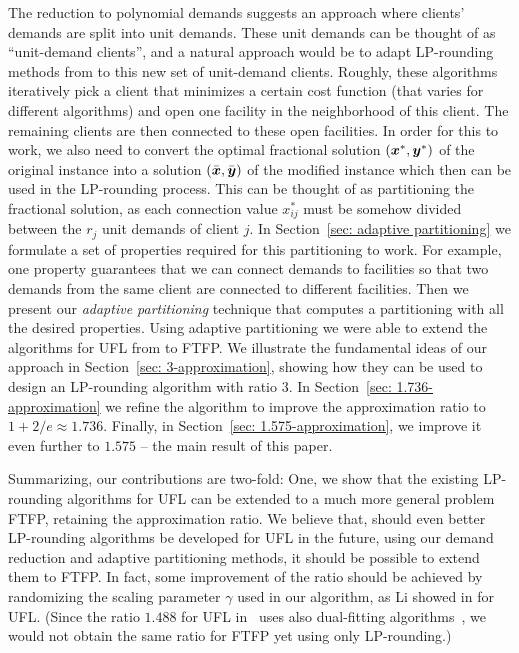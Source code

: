 \documentclass[11pt]{article}
\begin{document}
The reduction to polynomial demands suggests an approach
where clients' demands are split into unit demands. These
unit demands can be thought of as ``unit-demand clients'',
and a natural approach would be to adapt LP-rounding methods
from \cite{gupta08,ChudakS04,ByrkaGS10} to this new set of
unit-demand clients.  Roughly, these algorithms iteratively
pick a client that minimizes a certain cost function (that
varies for different algorithms) and open one facility in
the neighborhood of this client. The remaining clients are
then connected to these open facilities.  In order for this
to work, we also need to convert the optimal fractional
solution $(\boldsymbol{x}^\ast,\boldsymbol{y}^\ast)$ of the original instance
into a solution $(\bar{\boldsymbol{x}},\bar{\boldsymbol{y}})$ of the modified instance
which then can be used in the LP-rounding process. This can
be thought of as partitioning the fractional solution, as
each connection value $x^\ast_{ij}$ must be somehow divided
between the $r_j$ unit demands of client $j$. In
Section~\ref{sec: adaptive partitioning} we formulate a set
of properties required for this partitioning to work. For
example, one property guarantees that we can connect demands
to facilities so that two demands from the same client are
connected to different facilities. Then we present our
\emph{adaptive partitioning} technique that computes a
partitioning with all the desired properties. Using adaptive
partitioning we were able to extend the algorithms for UFL
from \cite{gupta08,ChudakS04,ByrkaGS10} to FTFP. We
illustrate the fundamental ideas of our approach in
Section~\ref{sec: 3-approximation}, showing how they can be
used to design an LP-rounding algorithm with ratio $3$.  In
Section~\ref{sec: 1.736-approximation} we refine the
algorithm to improve the approximation ratio to
$1+2/e\approx 1.736$.  Finally, in Section~\ref{sec:
  1.575-approximation}, we improve it even further to
$1.575$ -- the main result of this paper.

Summarizing, our contributions are two-fold: One, we show
that the existing LP-rounding algorithms for UFL can be
extended to a much more general problem FTFP, retaining the
approximation ratio. We believe that, should even better
LP-rounding algorithms be developed for UFL in the future,
using our demand reduction and adaptive partitioning
methods, it should be possible to extend them to FTFP.
In fact, some improvement of the ratio
should be achieved by randomizing the scaling parameter
$\gamma$ used in our algorithm, as Li showed in \cite{Li11}
for UFL.  (Since the ratio $1.488$ for UFL in~\cite{Li11}
uses also dual-fitting
algorithms~\cite{MahdianYZ06}, we would not obtain the same
ratio for FTFP yet using only LP-rounding.)
\end{document}
